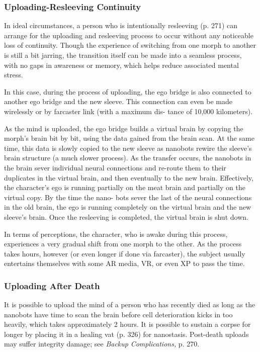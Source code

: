 \subsubsection{Uploading-Resleeving Continuity}

In ideal circumstances, a person who is intentionally 
resleeving (p. 271) can arrange for the uploading and 
resleeving process to occur without any noticeable 
loss of continuity. Though the experience of switching 
from one morph to another is still a bit jarring, the 
transition itself can be made into a seamless process, 
with no gaps in awareness or memory, which helps 
reduce associated mental stress.

In this case, during the process of uploading, the 
ego bridge is also connected to another ego bridge 
and the new sleeve. This connection can even be made 
wirelessly or by farcaster link (with a maximum dis-
tance of 10,000 kilometers). 

As the mind is uploaded, the ego bridge builds a 
virtual brain by copying the morph's brain bit by bit, 
using the data gained from the brain scan. At the same 
time, this data is slowly copied to the new sleeve as 
nanobots rewire the sleeve's brain structure (a much 
slower process). As the transfer occurs, the nanobots 
in the brain sever individual neural connections and 
re-route them to their duplicates in the virtual brain, 
and then eventually to the new brain. Effectively, the 
character's ego is running partially on the meat brain 
and partially on the virtual copy. By the time the nano-
bots sever the last of the neural connections in the 
old brain, the ego is running completely on the virtual 
brain and the new sleeve's brain. Once the resleeving 
is completed, the virtual brain is shut down.

In terms of perceptions, the character, who is awake 
during this process, experiences a very gradual shift 
from one morph to the other. As the process takes 
hours, however (or even longer if done via farcaster), 
the subject usually entertains themselves with some 
AR media, VR, or even XP to pass the time.

\subsubsection{Uploading After Death}

It is possible to upload the mind of a person who 
has recently died as long as the nanobots have time 
to scan the brain before cell deterioration kicks in 
too heavily, which takes approximately 2 hours. It 
is possible to sustain a corpse for longer by placing 
it in a healing vat (p. 326) for nanostasis. Post-death 
uploads may suffer integrity damage; see \textit{Backup }
\textit{Complications,} p. 270.

